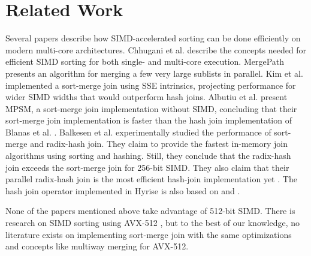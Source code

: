 \section{Related Work}
\label{sec:related-work}

Several papers describe how SIMD-accelerated sorting can be done efficiently on modern multi-core architectures.
Chhugani et al. \cite{10.14778/1454159.1454171} describe the concepts 
needed for efficient SIMD sorting for both single- and multi-core execution. MergePath \cite{MergePath}
presents an algorithm for merging a few very large sublists in parallel.
Kim et al. \cite{10.14778/1687553.1687564} implemented a sort-merge join using SSE intrinsics,
projecting performance for wider SIMD widths that would outperform hash joins. Albutiu 
et al. \cite{MPSM} present MPSM, a sort-merge join implementation 
without SIMD, concluding that their sort-merge join
implementation is faster than the hash join implementation of Blanas et al. \cite{10.1145/1989323.1989328}. 
Balkesen et al. \cite{Balkesen} experimentally studied the performance of sort-merge and radix-hash join.
They claim to provide the fastest in-memory join algorithms using sorting and hashing.
Still, they conclude that the radix-hash join exceeds the sort-merge join for 256-bit
SIMD. They also claim that their parallel radix-hash join is the most efficient hash-join
implementation yet \cite{6544839}. The hash join operator
implemented in Hyrise is also based on \cite{6544839} and \cite{Balkesen}. 

None of the papers mentioned above take advantage of 512-bit SIMD. 
There is research on SIMD sorting using AVX-512 \cite{Watkins, 8855628}, but to the best of our knowledge,
no literature exists on implementing sort-merge join with the same optimizations and concepts like
multiway merging for AVX-512. 

